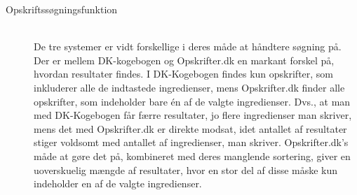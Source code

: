 \begin{description}
\item[Opskriftssøgningsfunktion] \hfill \\
De tre systemer er vidt forskellige i deres måde at håndtere søgning på. Der er mellem DK-kogebogen og Opskrifter.dk en markant forskel på, hvordan resultater findes. I DK-Kogebogen findes kun opskrifter, som inkluderer alle de indtastede ingredienser, mens Opskrifter.dk finder alle opskrifter, som indeholder bare én af de valgte ingredienser. Dvs., at man med DK-Kogebogen får færre resultater, jo flere ingredienser man skriver, mens det med Opskrifter.dk er direkte modsat, idet antallet af resultater stiger voldsomt med antallet af ingredienser, man skriver. Opskrifter.dk’s måde at gøre det på, kombineret med deres manglende sortering, giver en uoverskuelig mængde af resultater, hvor en stor del af disse måske kun indeholder en af de valgte ingredienser.
\end{description}




